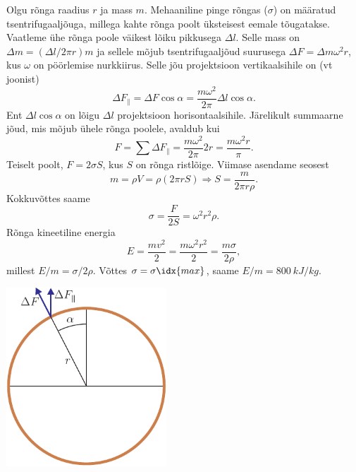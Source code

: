\documentclass[10pt, twoside]{article}
\begin{document}
{\osa Olgu rõnga raadius $r$ ja mass $m$. Mehaaniline pinge rõngas ($\sigma$) on määratud tsentrifugaaljõuga, millega kahte rõnga poolt üksteisest eemale tõugatakse. Vaatleme ühe rõnga poole väikest lõiku pikkusega $\Delta l$. Selle mass on $\Delta m = (\Delta l/2\pi r)m$ ja sellele mõjub tsentrifugaaljõud suurusega $\Delta F = \Delta m\omega^2 r$, kus $\omega$ on pöörlemise nurkkiirus. Selle jõu projektsioon vertikaalsihile on (vt joonist)
\[
\Delta F_{ \|}=\Delta F \cos \alpha=\frac{m \omega^{2}}{2 \pi} \Delta l \cos \alpha.
\]
Ent $\Delta l \cos \alpha$ on lõigu $\Delta l$ projektsioon horisontaalsihile. Järelikult summaarne jõud, mis mõjub ühele rõnga poolele, avaldub kui
\[
F=\sum \Delta F_{ \|}=\frac{m \omega^{2}}{2 \pi} 2 r=\frac{m \omega^{2} r}{\pi}.
\]
Teiselt poolt, $F = 2\sigma S$, kus $S$ on rõnga ristlõige. Viimase asendame seosest
\[
m=\rho V=\rho(2 \pi r S) \Rightarrow S=\frac{m}{2 \pi r \rho}.
\]
Kokkuvõttes saame
\[
\sigma = \frac{F}{2S} = \omega^2 r^2 \rho.
\]
Rõnga kineetiline energia
\[
E = \frac{mv^2}{2} = \frac{m\omega^2r^2}{2} = \frac{m\sigma}{2\rho},
\]
millest $E/m = \sigma /2\rho$. Võttes $\sigma = \sigma\idx{max}$, saame $E/m = \SI{800}{kJ/kg}$.

\begin{center}
	\includegraphics[width=0.45\textwidth]{2007-v3g-04-yl}
\end{center}
\probend
\bigskip


}
\end{document}
